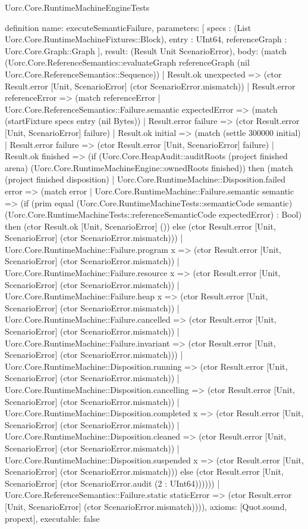 \begin{lexlean}{Uorc.Core.RuntimeMachineEngineTests}
\begin{semanticmodule}
definition{
  name: executeSemanticFailure,
  parameters: [
    specs : (List Uorc.Core.RuntimeMachineFixtures::Block),
    entry : UInt64,
    referenceGraph : Uorc.Core.Graph::Graph
  ],
  result: (Result Unit ScenarioError),
  body: (match (Uorc.Core.ReferenceSemantics::evaluateGraph referenceGraph (nil Uorc.Core.ReferenceSemantics::Sequence))
    | Result.ok unexpected => (ctor Result.error [Unit, ScenarioError] (ctor ScenarioError.mismatch))
    | Result.error referenceError => (match referenceError
      | Uorc.Core.ReferenceSemantics::Failure.semantic expectedError => (match (startFixture specs entry (nil Bytes))
        | Result.error failure => (ctor Result.error [Unit, ScenarioError] failure)
        | Result.ok initial => (match (settle 300000 initial)
          | Result.error failure => (ctor Result.error [Unit, ScenarioError] failure)
          | Result.ok finished => (if (Uorc.Core.HeapAudit::auditRoots (project finished arena) (Uorc.Core.RuntimeMachineEngine::ownedRoots finished)) then (match (project finished disposition)
            | Uorc.Core.RuntimeMachine::Disposition.failed error => (match error
              | Uorc.Core.RuntimeMachine::Failure.semantic semantic => (if (prim equal (Uorc.Core.RuntimeMachineTests::semanticCode semantic) (Uorc.Core.RuntimeMachineTests::referenceSemanticCode expectedError) : Bool) then (ctor Result.ok [Unit, ScenarioError] ()) else (ctor Result.error [Unit, ScenarioError] (ctor ScenarioError.mismatch)))
              | Uorc.Core.RuntimeMachine::Failure.program x => (ctor Result.error [Unit, ScenarioError] (ctor ScenarioError.mismatch))
              | Uorc.Core.RuntimeMachine::Failure.resource x => (ctor Result.error [Unit, ScenarioError] (ctor ScenarioError.mismatch))
              | Uorc.Core.RuntimeMachine::Failure.heap x => (ctor Result.error [Unit, ScenarioError] (ctor ScenarioError.mismatch))
              | Uorc.Core.RuntimeMachine::Failure.cancelled => (ctor Result.error [Unit, ScenarioError] (ctor ScenarioError.mismatch))
              | Uorc.Core.RuntimeMachine::Failure.invariant => (ctor Result.error [Unit, ScenarioError] (ctor ScenarioError.mismatch)))
            | Uorc.Core.RuntimeMachine::Disposition.running => (ctor Result.error [Unit, ScenarioError] (ctor ScenarioError.mismatch))
            | Uorc.Core.RuntimeMachine::Disposition.cancelling => (ctor Result.error [Unit, ScenarioError] (ctor ScenarioError.mismatch))
            | Uorc.Core.RuntimeMachine::Disposition.completed x => (ctor Result.error [Unit, ScenarioError] (ctor ScenarioError.mismatch))
            | Uorc.Core.RuntimeMachine::Disposition.cleaned => (ctor Result.error [Unit, ScenarioError] (ctor ScenarioError.mismatch))
            | Uorc.Core.RuntimeMachine::Disposition.suspended x => (ctor Result.error [Unit, ScenarioError] (ctor ScenarioError.mismatch))) else (ctor Result.error [Unit, ScenarioError] (ctor ScenarioError.audit (2 : UInt64))))))
      | Uorc.Core.ReferenceSemantics::Failure.static staticError => (ctor Result.error [Unit, ScenarioError] (ctor ScenarioError.mismatch)))),
  axioms: [Quot.sound, propext],
  executable: false
}


\end{semanticmodule}
\end{lexlean}
